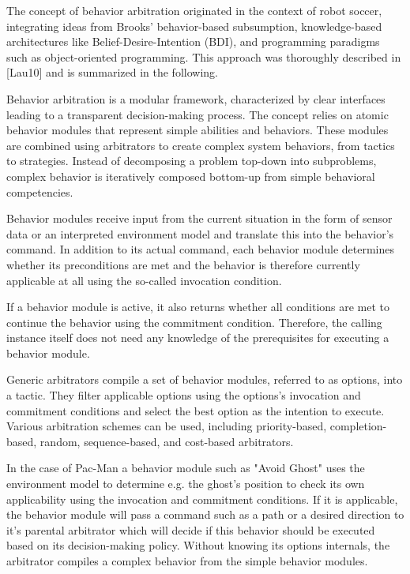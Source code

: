 The concept of behavior arbitration originated in the context of robot soccer, integrating ideas from Brooks' behavior-based subsumption, knowledge-based architectures like Belief-Desire-Intention (BDI), and programming paradigms such as object-oriented programming.
This approach was thoroughly described in [Lau10] and is summarized in the following.

Behavior arbitration is a modular framework, characterized by clear interfaces leading to a transparent decision-making process.
The concept relies on atomic behavior modules that represent simple abilities and behaviors.
These modules are combined using arbitrators to create complex system behaviors, from tactics to strategies.
Instead of decomposing a problem top-down into subproblems, complex behavior is iteratively composed bottom-up from simple behavioral competencies.

Behavior modules receive input from the current situation in the form of sensor data or an interpreted environment model and translate this into the behavior's command.
In addition to its actual command, each behavior module determines whether its preconditions are met and the behavior is therefore currently applicable at all using the so-called invocation condition.

If a behavior module is active, it also returns whether all conditions are met to continue the behavior using the commitment condition.
Therefore, the calling instance itself does not need any knowledge of the prerequisites for executing a behavior module.

Generic arbitrators compile a set of behavior modules, referred to as options, into a tactic.
They filter applicable options using the options's invocation and commitment conditions and select the best option as the intention to execute.
Various arbitration schemes can be used, including priority-based, completion-based, random, sequence-based, and cost-based arbitrators.

In the case of Pac-Man a behavior module such as "Avoid Ghost" uses the environment model to determine e.g. the ghost's position to check its own applicability using the invocation and commitment conditions.
If it is applicable, the behavior module will pass a command such as a path or a desired direction to it's parental arbitrator which will decide if this behavior should be executed based on its decision-making policy.
Without knowing its options internals, the arbitrator compiles a complex behavior from the simple behavior modules.

